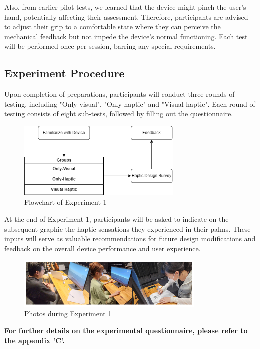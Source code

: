 Also, from earlier pilot tests, we learned that the device might pinch the user's hand, potentially affecting their assessment. Therefore, participants are advised to adjust their grip to a comfortable state where they can perceive the mechanical feedback but not impede the device's normal functioning. Each test will be performed once per session, barring any special requirements.

\subsection{Experiment Procedure}
Upon completion of preparations, participants will conduct three rounds of testing, including "Only-visual", "Only-haptic" and "Visual-haptic". Each round of testing consists of eight sub-tests, followed by filling out the questionnaire.
\begin{figure}[h]
\centering
\includegraphics[width=0.7\textwidth]{A_thesis/figures/037.png}
\caption{Flowchart of Experiment 1}
\end{figure}

At the end of Experiment 1, participants will be asked to indicate on the subsequent graphic the haptic sensations they experienced in their palms. These inputs will serve as valuable recommendations for future design modifications and feedback on the overall device performance and user experience.

\begin{figure}[h]
\centering
\includegraphics[width=0.8\textwidth]{A_thesis/figures/038.png}
\caption{Photos during Experiment 1}
\end{figure}

\textbf{For further details on the experimental questionnaire, please refer to the appendix 'C'.}

